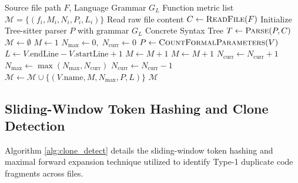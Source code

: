 \begin{algorithm}[H]
\caption{AST Parsing and Cyclomatic Complexity Extraction}
\label{alg:ast_parse}
\small
\begin{algorithmic}[1]
\Require Source file path $F$, Language Grammar $G_L$
\Ensure Function metric list $\mathcal{M} = \{(f_i, M_i, N_i, P_i, L_i)\}$
\State Read raw file content $C \leftarrow \Call{ReadFile}{F}$
\State Initialize Tree-sitter parser $P$ with grammar $G_L$
\State Concrete Syntax Tree $T \leftarrow \Call{Parse}{P, C}$
\State $\mathcal{M} \leftarrow \emptyset$
        \State $M \leftarrow 1$ 
        \State $N_{\max} \leftarrow 0, \; N_{\text{curr}} \leftarrow 0$
        \State $P \leftarrow \Call{CountFormalParameters}{V}$
        \State $L \leftarrow V.\text{endLine} - V.\text{startLine} + 1$
                \State $M \leftarrow M + 1$ 
                \State $M \leftarrow M + 1$ 
            \EndIf
                \State $N_{\text{curr}} \leftarrow N_{\text{curr}} + 1$
                \State $N_{\max} \leftarrow \max(N_{\max}, N_{\text{curr}})$
                \State $N_{\text{curr}} \leftarrow N_{\text{curr}} - 1$
            \EndIf
        \EndFor
        \State $\mathcal{M} \leftarrow \mathcal{M} \cup \{(V.\text{name}, M, N_{\max}, P, L)\}$
    \EndIf
\EndFor
\State \Return $\mathcal{M}$
\end{algorithmic}
\end{algorithm}

\clearpage
\subsection{Sliding-Window Token Hashing and Clone Detection}
Algorithm \ref{alg:clone_detect} details the sliding-window token hashing and maximal forward expansion technique utilized to identify Type-1 duplicate code fragments across files.

